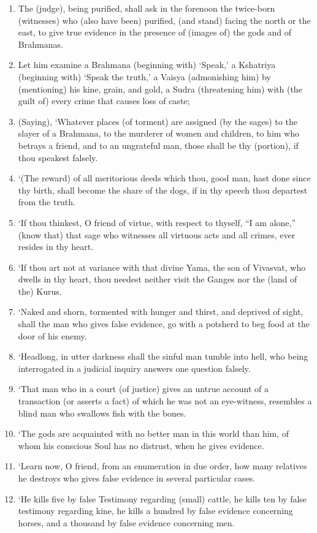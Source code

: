 \begin{enumerate}
\item The (judge), being purified, shall ask in the forenoon the twice-born (witnesses) who (also have been) purified, (and stand) facing the north or the east, to give true evidence in the presence of (images of) the gods and of Brahmanas.
\item Let him examine a Brahmana (beginning with) `Speak,' a Kshatriya (beginning with) `Speak the truth,' a Vaisya (admonishing him) by (mentioning) his kine, grain, and gold, a Sudra (threatening him) with (the guilt of) every crime that causes loss of caste;
\item (Saying), `Whatever places (of torment) are assigned (by the sages) to the slayer of a Brahmana, to the murderer of women and children, to him who betrays a friend, and to an ungrateful man, those shall be thy (portion), if thou speakest falsely.
\item `(The reward) of all meritorious deeds which thou, good man, hast done since thy birth, shall become the share of the dogs, if in thy speech thou departest from the truth.
\item `If thou thinkest, O friend of virtue, with respect to thyself, ``I am alone,'' (know that) that sage who witnesses all virtuous acts and all crimes, ever resides in thy heart.
\item `If thou art not at variance with that divine Yama, the son of Vivasvat, who dwells in thy heart, thou needest neither visit the Ganges nor the (land of the) Kurus.
\item `Naked and shorn, tormented with hunger and thirst, and deprived of sight, shall the man who gives false evidence, go with a potsherd to beg food at the door of his enemy.
\item `Headlong, in utter darkness shall the sinful man tumble into hell, who being interrogated in a judicial inquiry answers one question falsely.
\item `That man who in a court (of justice) gives an untrue account of a transaction (or asserts a fact) of which he was not an eye-witness, resembles a blind man who swallows fish with the bones.
\item `The gods are acquainted with no better man in this world than him, of whom his conscious Soul has no distrust, when he gives evidence.
\item `Learn now, O friend, from an enumeration in due order, how many relatives he destroys who gives false evidence in several particular cases.
\item `He kills five by false Testimony regarding (small) cattle, he kills ten by false testimony regarding kine, he kills a hundred by false evidence concerning horses, and a thousand by false evidence concerning men.

\end{enumerate}
